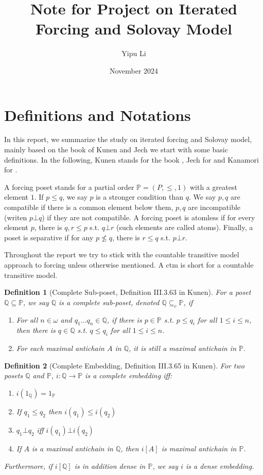 \documentclass{article}
\title{Note for Project on Iterated Forcing and Solovay Model}
\author{Yipu Li}
\date{November 2024}
\newtheorem{definition}{Definition}
\newcommand{\bbP}{\mathbb{P}}
\newcommand{\bbQ}{\mathbb{Q}}
\begin{document}
\maketitle
\tableofcontents

\section{Definitions and Notations}

In this report, we summarize the study on iterated forcing and Solovay model, mainly based on the book of Kunen and Jech we start with some basic definitions. In the following, Kunen stands for the book \cite{Kunen}, Jech for \cite{Jech} and Kanamori for \cite{Kanamori}.

A forcing poset stands for a partial order $\bbP = (P,\leq,1)$ with a greatest element $1$. If $p\leq q$, we say $p$ is a stronger condition than $q$. We say $p,q$ are compatible if there is a common element below them, $p,q$ are incompatible (writen $p\bot q$) if they are not compatible. A forcing poset is atomless if for every element $p$, there is $q,r\leq p$ s.t. $q\bot r$ (such elements are called atoms). Finally, a poset is separative if for any $p\not\leq q$, there is $r\leq q$ s.t. $p\bot r$.

Throughout the report we try to stick with the countable transitive model approach to forcing unless otherwise mentioned. A ctm is short for a countable transitive model.

\begin{definition}[Complete Sub-poset, Definition III.3.63 in Kunen]
    For a poset $\bbQ\subseteq \bbP$, we say $\bbQ$ is a complete sub-poset, denoted $\bbQ\subseteq_{c}\bbP$, if 
    \begin{enumerate}
        \item For all $n\in \omega$ and $q_1\dots q_n\in \bbQ$, if there is $p\in \bbP$ s.t. $p\leq q_i$ for all $1\leq i\leq n$, then there is $q\in \bbQ$ s.t. $q\leq q_i$ for all $1\leq i\leq n$.
        \item For each maximal antichain $A$ in $\bbQ$, it is still a maximal antichain in $\bbP$.
    \end{enumerate}
\end{definition}

\begin{definition}[Complete Embedding, Definition III.3.65 in Kunen]
    For two posets $\bbQ$ and $\bbP$, $i:\bbQ\to \bbP$ is a complete embedding iff:
    \begin{enumerate}
        \item $i(1_\bbQ) = 1_\bbP$
        \item If $q_1\leq q_2$ then $i(q_1)\leq i(q_2)$
        \item $q_1\bot q_2$ iff $i(q_1)\bot i(q_2)$
        \item If $A$ is a maximal antichain in $\bbQ$, then $i[A]$ is maximal antichain in $\bbP$.
    \end{enumerate}
    Furthermore, if $i[\bbQ]$ is in addition dense in $\bbP$, we say $i$ is a dense embedding.
\end{definition}
\end{document}
